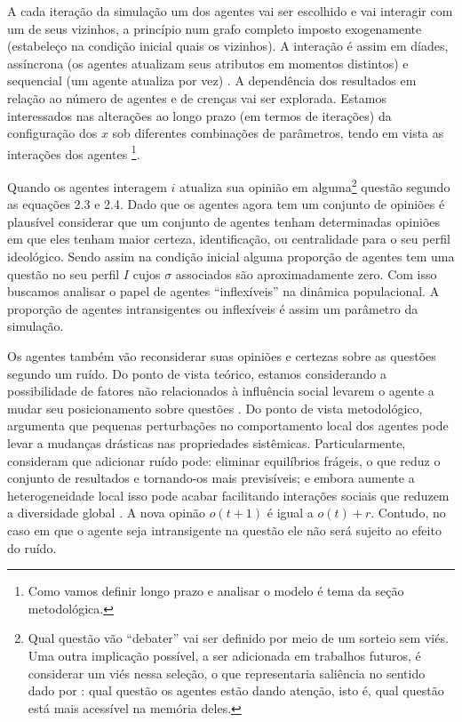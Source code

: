 A cada iteração da simulação um dos agentes vai ser escolhido e vai interagir
com um de seus vizinhos, a princípio num grafo completo imposto exogenamente
(estabeleço na condição inicial quais os vizinhos). A interação é assim em
díades, assíncrona (os agentes atualizam seus atributos em momentos distintos) e
sequencial (um agente atualiza por vez) \cite{wilensky2015introduction}. A
dependência dos resultados em relação ao número de agentes e de crenças vai ser
explorada. Estamos interessados nas alterações ao longo prazo (em termos de
iterações) da configuração dos \(x\) sob diferentes combinações de parâmetros,
tendo em vista as interações dos agentes \cite{acemoglu2011opinion}
\footnote{Como vamos definir longo prazo e analisar o modelo é tema da seção
  metodológica.}.

Quando os agentes interagem \(i\) atualiza sua opinião em alguma\footnote{Qual
  questão vão ``debater'' vai ser definido por meio de um sorteio sem viés. Uma
  outra implicação possível, a ser adicionada em trabalhos futuros, é considerar
  um viés nessa seleção, o que representaria saliência no sentido dado por
  : qual questão os agentes estão dando atenção,
  isto é, qual questão está mais acessível na memória deles.} questão segundo as
equações 2.3 e 2.4. Dado que os agentes agora tem um conjunto de opiniões é
plausível considerar que um conjunto de agentes tenham determinadas opiniões em
que eles tenham maior certeza, identificação, ou centralidade para o seu perfil
ideológico. Sendo assim na condição inicial alguma proporção de agentes tem uma
questão no seu perfil \(I\) cujos \(\sigma\) associados são aproximadamente zero. Com
isso buscamos analisar o papel de agentes ``inflexíveis'' na dinâmica
populacional. A proporção de agentes intransigentes ou inflexíveis é assim um
parâmetro da simulação.

Os agentes também vão reconsiderar suas opiniões e certezas sobre as questões
segundo um ruído. Do ponto de vista teórico, estamos considerando a
possibilidade de fatores não relacionados à influência social levarem o agente a
mudar seu posicionamento sobre questões \cite{flache2017, lorenz2017modeling}.
Do ponto de vista metodológico,  argumenta que
pequenas perturbações no comportamento local dos agentes pode levar a mudanças
drásticas nas propriedades sistêmicas. Particularmente, consideram que adicionar
ruído pode: eliminar equilíbrios frágeis, o que reduz o conjunto de resultados e
tornando-os mais previsíveis; e embora aumente a heterogeneidade local isso pode
acabar facilitando interações sociais que reduzem a diversidade global
\cite[p.323]{macy2015signal}. A nova opinão \(o(t+1)\) é igual a  \(o(t) + r\).
Contudo, no caso em que o agente seja intransigente na questão ele não será
sujeito ao efeito do ruído.


